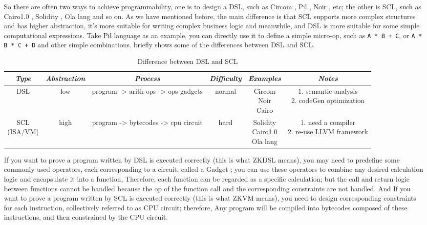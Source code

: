 So there are often two ways to achieve programmability, one is to design a DSL, such as Circom \cite{website:Circom}, Pil \cite{website:Pil}, Noir \cite{website:Noir}, etc; the other is SCL, 
such as Cairo1.0 \cite{website:Cairo1.0}, Solidity \cite{website:Solidity}, Ola lang \cite{website:Ola-lang} and so on. As we have mentioned before, the main difference is that SCL supports more complex structures and has 
higher abstraction, it's more suitable for writing complex business logic and meanwhile, and DSL is more suitable for some simple computational expressions. 
Take Pil \cite{website:Pil} language as an example, you can directly use it to define a simple micro-op, such as \verb|A * B + C|, or \verb|A * B * C + D| and other simple combinations. 
 briefly shows some of the differences between DSL and SCL.

\begin{table}[!ht]
    \centering
    \begin{tabular}{|c|c|c|c|c|c|}
    \hline
        \emph{Type} & \emph{Abstraction} & \emph{Process} & \emph{Difficulty} & \emph{Examples} & \emph{Notes} \\ \hline
        DSL & low & program -> arith-ops -> ops gadgets & normal & \makecell{Circom \\ Noir \\ Cairo} & \makecell{1. semantic analysis \\ 2. codeGen optimization} \\ \hline
        \makecell{SCL \\ (ISA/VM)} & high & program -> bytecodes -> cpu circuit & hard & \makecell{Solidity \\ Cairo1.0 \\ Ola lang} & \makecell{1. need a compiler \\2. re-use LLVM framework} \\ \hline
    \end{tabular}
    \caption{Difference between DSL and SCL}
    \label{table:Difference between DSL and SCL}
\end{table}

If you want to prove a program written by DSL is executed correctly (this is what ZKDSL means), you may need to predefine some commonly used operators, each corresponding to a circuit, called a Gadget \cite{website:Gadget}; you can use these operators to combine any desired calculation logic and 
encapsulate it into a function, Therefore, each function can be regarded as a specific calculation; but the call and return logic between functions cannot be handled because the op of the function
 call and the corresponding constraints are not handled. And If you want to prove a program written by SCL is executed correctly (this is what ZKVM means), you need to design corresponding constraints for each instruction, collectively referred to as CPU circuit; therefore, Any program will be compiled into 
 bytecodes composed of these instructions, and then constrained by the CPU circuit.

